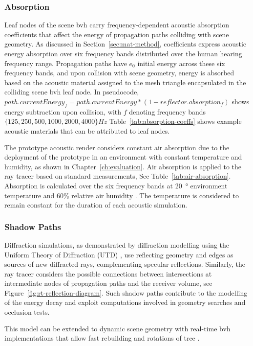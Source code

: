 \subsubsection{Absorption}
Leaf nodes of the scene \acrshort{bvh} carry frequency-dependent acoustic absorption coefficients that affect the energy of propagation paths colliding with scene geometry. As discussed in Section~\ref{sec:mat-method}, coefficients express acoustic energy absorption over six frequency bands distributed over the human hearing frequency range. Propagation paths have $e_0$ initial energy across these six frequency bands, and upon collision with scene geometry, energy is absorbed based on the acoustic material assigned to the mesh triangle encapsulated in the colliding scene \acrshort{bvh} leaf node. In pseudocode, $path.currentEnergy_f = path.currentEnergy * (1 - reflector.absorption_f)$ shows energy subtraction upon collision, with $f$ denoting frequency bands $\{ 125, 250, 500, 1000, 2000, 4000 \} Hz$ Table~\ref{tab:absorption-coeffs} shows example acoustic materials that can be attributed to leaf nodes.\par
The prototype acoustic render considers constant air absorption due to the deployment of the prototype in an environment with constant temperature and humidity, as shown in Chapter~\ref{ch:evaluation}. Air absorption is applied to the ray tracer based on standard measurements, See Table~\ref{tab:air-absorption}. Absorption is calculated over the six frequency bands at \qty{20}{\degree} environment temperature and 60\% relative air humidity \citep{nikolic2002improvements,harris1966absorption}. The temperature is considered to remain constant for the duration of each acoustic simulation.


\subsubsection{Shadow Paths}
Diffraction simulations, as demonstrated by diffraction modelling using the Uniform Theory of Diffraction (UTD) \cite{tsingos2001modeling}, use reflecting geometry and edges as sources of new diffracted rays, complementing specular reflections. Similarly, the ray tracer considers the possible connections between intersections at intermediate nodes of propagation paths and the receiver volume, see Figure~\ref{fig:rt-reflection-diagram}. Such shadow paths contribute to the modelling of the energy decay and exploit computations involved in geometry searches and occlusion tests.\par
This model can be extended to dynamic scene geometry with real-time \acrshort{bvh} implementations that allow fast rebuilding and rotations of tree \citep{kopta2012fast}.

